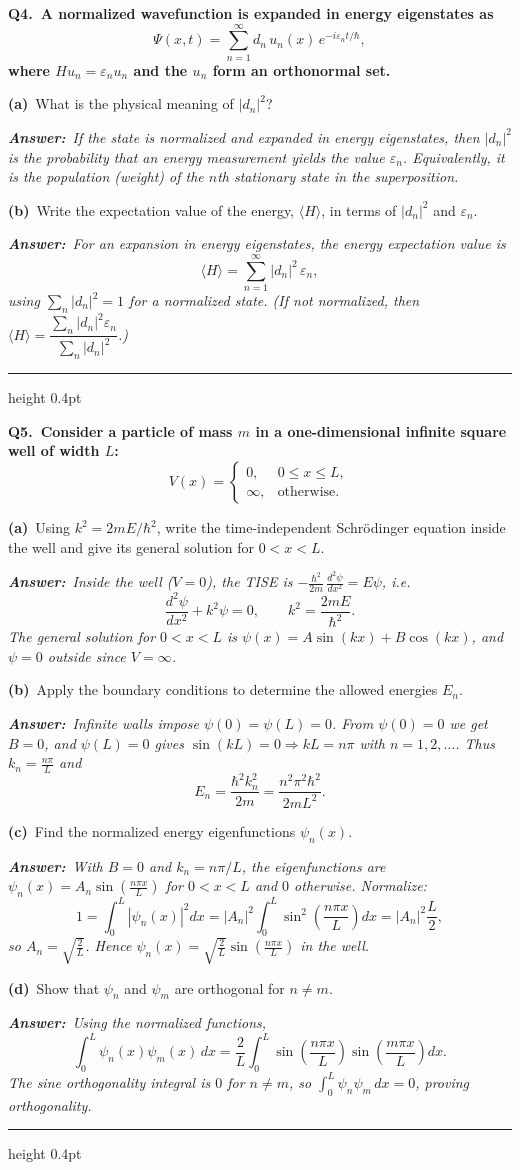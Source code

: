 \documentclass[11pt]{article}
\newcommand{\QuestionStyle}[1]{{\large\bfseries\boldmath #1}}
\newcommand{\MPBlock}[3]{%
  \Needspace{8\baselineskip}%
  \noindent
  \begin{minipage}{\linewidth}
    \QuestionStyle{#1.~#2}

    \vspace{0.25em}
    #3

    \vspace{0.25em}
    \hrule height 0.4pt
  \end{minipage}
  \vspace{0.75em}
}
\newcommand{\OEPart}[3]{%
  \par\vspace{0.35em}
  \noindent\textbf{(#1)}~#2
  \par\vspace{0.15em}
  \noindent\textit{\textbf{Answer:}~#3}
  \par
}
\begin{document}
\MPBlock{Q4}{A normalized wavefunction is expanded in energy eigenstates as
\[
\Psi(x,t)=\sum_{n=1}^{\infty} d_n\,u_n(x)\,e^{-i\varepsilon_n t/\hbar},
\]
where $H u_n=\varepsilon_n u_n$ and the $u_n$ form an orthonormal set.}{
  \OEPart{a}{What is the physical meaning of $|d_n|^2$?}{If the state is normalized and expanded in energy eigenstates, then $|d_n|^2$ is the probability that an energy measurement yields the value $\varepsilon_n$. Equivalently, it is the population (weight) of the $n$th stationary state in the superposition.}
  \OEPart{b}{Write the expectation value of the energy, $\langle H\rangle$, in terms of $|d_n|^2$ and $\varepsilon_n$.}{For an expansion in energy eigenstates, the energy expectation value is
\[
\langle H\rangle=\sum_{n=1}^{\infty} |d_n|^2\,\varepsilon_n,
\]
using $\sum_n |d_n|^2=1$ for a normalized state. (If not normalized, then $\langle H\rangle=\dfrac{\sum_n |d_n|^2\varepsilon_n}{\sum_n |d_n|^2}$.)}
}

\MPBlock{Q5}{Consider a particle of mass $m$ in a one-dimensional infinite square well of width $L$:
\[
V(x)=\begin{cases}
0,& 0\le x\le L,\\
\infty,& \text{otherwise}.
\end{cases}
\]
}{
  \OEPart{a}{Using $k^2=2mE/\hbar^2$, write the time-independent Schr\"odinger equation inside the well and give its general solution for $0<x<L$.}{Inside the well ($V=0$), the TISE is $-\frac{\hbar^2}{2m}\,\frac{d^2\psi}{dx^2}=E\psi$, i.e.
\[\frac{d^2\psi}{dx^2}+k^2\psi=0,\qquad k^2=\frac{2mE}{\hbar^2}.
\]
The general solution for $0<x<L$ is $\psi(x)=A\sin(kx)+B\cos(kx)$, and $\psi=0$ outside since $V=\infty$.}
  \OEPart{b}{Apply the boundary conditions to determine the allowed energies $E_n$.}{Infinite walls impose $\psi(0)=\psi(L)=0$. From $\psi(0)=0$ we get $B=0$, and $\psi(L)=0$ gives $\sin(kL)=0\Rightarrow kL=n\pi$ with $n=1,2,\dots$. Thus $k_n=\frac{n\pi}{L}$ and
\[
E_n=\frac{\hbar^2 k_n^2}{2m}=\frac{n^2\pi^2\hbar^2}{2mL^2}.
\]}
  \OEPart{c}{Find the normalized energy eigenfunctions $\psi_n(x)$.}{With $B=0$ and $k_n=n\pi/L$, the eigenfunctions are $\psi_n(x)=A_n\sin\left(\frac{n\pi x}{L}\right)$ for $0<x<L$ and $0$ otherwise. Normalize:
\[
1=\int_0^L |\psi_n(x)|^2dx=|A_n|^2\int_0^L\sin^2\left(\frac{n\pi x}{L}\right)dx=|A_n|^2\frac{L}{2},
\]
so $A_n=\sqrt{\frac{2}{L}}$. Hence $\psi_n(x)=\sqrt{\frac{2}{L}}\sin\left(\frac{n\pi x}{L}\right)$ in the well.}
  \OEPart{d}{Show that $\psi_n$ and $\psi_m$ are orthogonal for $n\neq m$.}{Using the normalized functions,
\[
\int_0^L \psi_n(x)\psi_m(x)\,dx=\frac{2}{L}\int_0^L \sin\left(\frac{n\pi x}{L}\right)\sin\left(\frac{m\pi x}{L}\right)dx.
\]
The sine orthogonality integral is $0$ for $n\neq m$, so $\int_0^L \psi_n\psi_m\,dx=0$, proving orthogonality.}
}
\end{document}
